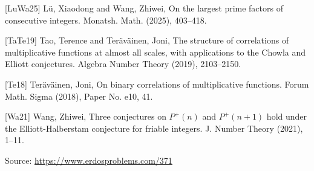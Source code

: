 \documentclass{article}
\begin{document}
 [LuWa25] L\"u, Xiaodong and Wang, Zhiwei, On the largest prime factors of consecutive integers. Monatsh. Math. (2025), 403--418.
 
 [TaTe19] Tao, Terence and Ter\"{a}v\"{a}inen, Joni, The structure of correlations of multiplicative functions at
almost all scales, with applications to the {C}howla and
{E}lliott conjectures. Algebra Number Theory (2019), 2103--2150.
 
 [Te18] Ter\"{a}v\"{a}inen, Joni, On binary correlations of multiplicative functions. Forum Math. Sigma (2018), Paper No. e10, 41.
 
 [Wa21] Wang, Zhiwei, Three conjectures on {$P^+(n)$} and {$P^+(n+1)$} hold under
the {E}lliott-{H}alberstam conjecture for friable integers. J. Number Theory (2021), 1--11.

\bigskip
\noindent\small{Source: \url{https://www.erdosproblems.com/371}}
\end{document}
